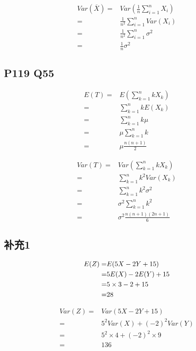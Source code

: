 \documentclass[a4paper,12pt]{ctexart}
\begin{document}
\begin{align*}
	Var(\overline{X}) =& Var\left(\frac{1}{n} \sum_{i = 1}^{n} X_i\right) \\
	                  =& \frac{1}{n^2} \sum_{i = 1}^{n} Var(X_i) \\
					  =& \frac{1}{n^2} \sum_{i = 1}^{n} \sigma^2 \\
					  =& \frac{1}{n} \sigma^2
\end{align*}

\subsection*{P119 Q55}

\begin{align*}
	E(T) =& E\left(\sum_{k=1}^{n} k X_k\right) \\
	     =& \sum_{k=1}^{n} k E(X_k) \\
		 =& \sum_{k=1}^{n} k \mu \\
		 =& \mu \sum_{k=1}^{n} k \\
		 =& \mu \frac{n(n+1)}{2}
\end{align*}

\begin{align*}
	Var(T) =& Var\left(\sum_{k=1}^{n} k X_k\right) \\
	       =& \sum_{k=1}^{n} k^2 Var(X_k) \\
		   =& \sum_{k=1}^{n} k^2 \sigma^2 \\
		   =& \sigma^2 \sum_{k=1}^{n} k^2 \\
		   =& \sigma^2 \frac{n(n+1)(2n+1)}{6}
\end{align*}

\subsection*{补充1}

\begin{align*}
	E(Z) =& E(5X - 2Y + 15) \\
	     =& 5 E(X) - 2 E(Y) + 15 \\
		 =& 5 \times 3 - 2 \time 1 + 15 \\
		 =& 28
\end{align*}

\begin{align*}
	Var(Z) =& Var(5X - 2Y + 15) \\
	       =& 5^2 Var(X) + (-2)^2 Var(Y) \\
		   =& 5^2 \times 4 + (-2)^2 \times 9 \\
		   =& 136
\end{align*}
\end{document}
